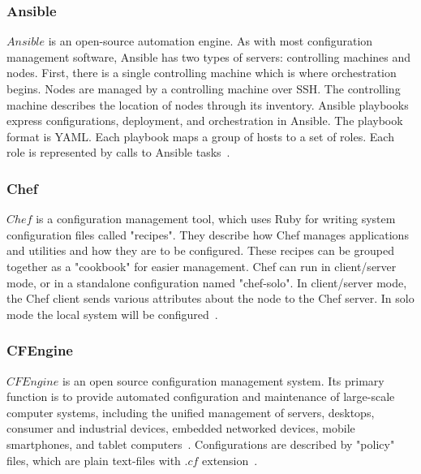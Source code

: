 \subsubsection*{Ansible} \label{lang:ansible}
$Ansible$ is an open-source automation engine. %
As with most configuration management software, Ansible has two types of servers: controlling machines and nodes.
First, there is a single controlling machine which is where orchestration begins.
Nodes are managed by a controlling machine over SSH.
The controlling machine describes the location of nodes through its inventory.
Ansible playbooks express configurations, deployment, and orchestration in Ansible.
The playbook format is YAML. 
Each playbook maps a group of hosts to a set of roles.
Each role is represented by calls to Ansible tasks~\cite{ansible}.
\subsubsection*{Chef} \label{lang:shef}
$Chef$ is a configuration management tool, which uses Ruby for writing system configuration files called "recipes".
They describe how Chef manages applications and utilities and how they are to be configured.
These recipes can be grouped together as a "cookbook" for easier management.
Chef can run in client/server mode, or in a standalone configuration named "chef-solo".
In client/server mode, the Chef client sends various attributes about the node to the Chef server. 
In solo mode the local system will be configured~\cite{chef}.
\subsubsection*{CFEngine}
$CFEngine$ is an open source configuration management system.
Its primary function is to provide automated configuration and maintenance of large-scale computer systems, including the unified management of servers, desktops, consumer and industrial devices, embedded networked devices, mobile smartphones, and tablet computers~\cite{cfengine}.
Configurations are described by "policy" files, which are plain text-files with .$cf$ extension~\cite{cfengine2}.
